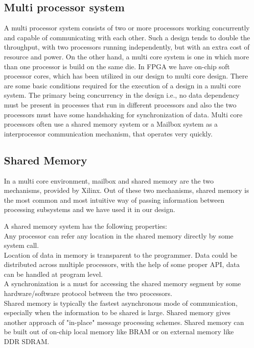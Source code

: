 \documentclass[preprint,12pt]{elsarticle}
\begin{document}
\subsection{Multi processor system} 
\label{mps}
A multi processor system consists of two or more processors working concurrently and capable of communicating with each other. Such a design tends to double the throughput, with two processors running independently, but with an extra cost of resource and power. On the other hand, a multi core system is one in which more than one processor is build on the same die. In FPGA we have on-chip soft processor cores, which has been utilized in our design to  multi core design. There are some basic conditions required for the execution of a design in a multi core system. The primary being concurrency in the design i.e., no data dependency must be present in processes that run in different processors and also the two processors must have some handshaking for synchronization of data.  Multi core processors often use a shared memory system or a Mailbox system as a interprocessor communication mechanism, that operates very quickly\cite{multicore}.
 \subsection{ Shared Memory }
\label{shared}
 In a multi core environment, mailbox and shared memory \cite{mailbox} are the two mechanisms, provided by Xilinx. Out of these two mechanisms, shared memory is the most common and most intuitive way of passing information between processing subsystems and we have used it in our design.
\par A shared memory system has the following 
properties\cite{mailbox}:\\
\textbullet Any processor can refer any location in the  shared memory directly by some system call.\\
\textbullet Location of data in memory is transparent to the programmer. Data could be distributed across multiple processors, with the help of some proper API, data can be handled at program level.\\
\textbullet A synchronization is a must for accessing the shared memory segment by some
hardware/software protocol between the two processors.\\

Shared memory is typically the fastest asynchronous mode of communication,
especially when the information to be shared is large. Shared memory
gives another approach of "in-place" message processing schemes. Shared
memory can be built out of on-chip local memory like BRAM or on external memory like DDR SDRAM.
\end{document}
